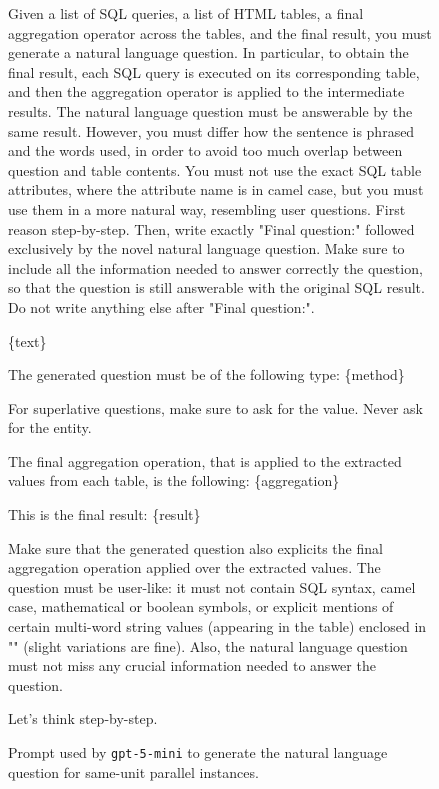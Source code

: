 \begin{figure}[t!]\small
\centering
\begin{tcolorbox}[
  title=Parallel same unit question generation prompt,
  fonttitle=\bfseries,
  sharp corners=all,
]

Given a list of SQL queries, a list of HTML tables, a final aggregation operator across the tables, and the final result, you must generate a natural language question.
In particular, to obtain the final result, each SQL query is executed on its corresponding table, and then the aggregation operator is applied to the intermediate results.
The natural language question must be answerable by the same result. However, you must differ how the sentence is phrased and the words used, in order to avoid too much overlap between question and table contents.
You must not use the exact SQL table attributes, where the attribute name is in camel case, but you must use them in a more natural way, resembling user questions.
First reason step-by-step. Then, write exactly "Final question:" followed exclusively by the novel natural language question. Make sure to include all the information needed to answer correctly the question, so that the question is still answerable with the original SQL result.
Do not write anything else after "Final question:".

\vspace{\baselineskip}
\{text\}
\vspace{\baselineskip}

The generated question must be of the following type: \{method\}

For superlative questions, make sure to ask for the value. Never ask for the entity.

The final aggregation operation, that is applied to the extracted values from each table, is the following: \{aggregation\}

This is the final result: \{result\}

\vspace{\baselineskip}
Make sure that the generated question also explicits the final aggregation operation applied over the extracted values.
The question must be user-like: it must not contain SQL syntax, camel case, mathematical or boolean symbols, or explicit mentions of certain multi-word string values (appearing in the table) enclosed in "" (slight variations are fine).
Also, the natural language question must not miss any crucial information needed to answer the question.

Let's think step-by-step.

\end{tcolorbox}
\caption{Prompt used by \texttt{gpt-5-mini} to generate the natural language question for same-unit parallel instances.}
\label{fig:par_su_quest_prompt}
\end{figure}


